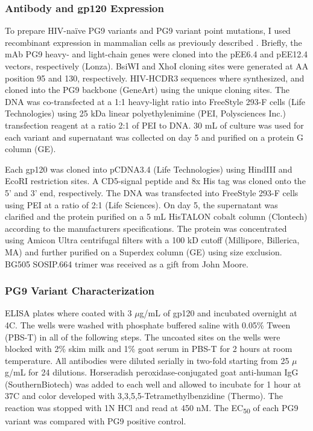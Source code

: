 \subsubsection{Antibody and gp120 Expression}
To prepare HIV-naïve PG9 variants and PG9 variant point mutations, I used recombinant expression in mammalian cells as previously described \citep{Xu:2010da}. Briefly, the mAb PG9 heavy- and light-chain genes were cloned into the pEE6.4 and pEE12.4 vectors, respectively (Lonza). BsiWI and XhoI cloning sites were generated at AA position 95 and 130, respectively. HIV-\naive HCDR3 sequences where synthesized, and cloned into the PG9 backbone (GeneArt) using the unique cloning sites. The DNA was co-transfected at a 1:1 heavy-light ratio into FreeStyle 293-F cells (Life Technologies) using 25 kDa linear polyethylenimine (PEI, Polysciences Inc.) transfection reagent at a ratio 2:1 of PEI to DNA. 30 mL of culture was used for each variant and supernatant was collected on day 5 and purified on a protein G column (GE).

Each gp120 was cloned into pCDNA3.4 (Life Technologies) using HindIII and EcoRI restriction sites. A CD5-signal peptide and 8x His tag was cloned onto the 5' and 3' end, respectively. The DNA was transfected into FreeStyle 293-F cells using PEI at a ratio of 2:1 (Life Sciences). On day 5, the supernatant was clarified and the protein purified on a 5 mL HisTALON cobalt column (Clontech) according to the manufacturers specifications. The protein was concentrated using Amicon Ultra centrifugal filters with a 100 kD cutoff (Millipore, Billerica, MA) and further purified on a Superdex column (GE) using size exclusion. BG505 SOSIP.664 trimer was received as a gift from John Moore.

\subsubsection{PG9 Variant Characterization}
ELISA plates where coated with 3 $\mu$g/mL of gp120 and incubated overnight at 4\degree C. The wells were washed with phosphate buffered saline with 0.05\% Tween (PBS-T) in all of the following steps. The uncoated sites on the wells were blocked with 2\% skim milk and 1\% goat serum in PBS-T for 2 hours at room temperature.  All antibodies were diluted serially in two-fold starting from 25 $\mu$g/mL for 24 dilutions. Horseradish peroxidase-conjugated goat anti‑human IgG (SouthernBiotech) was added to each well and allowed to incubate for 1 hour at 37\degree C and color developed with 3,3,5,5-Tetramethylbenzidine (Thermo). The reaction was stopped with 1N HCl and read at 450 nM. The EC\textsubscript{50} of each PG9 variant was compared with PG9 positive control.

